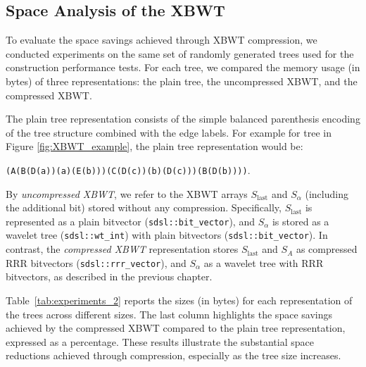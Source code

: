 \subsection{Space Analysis of the XBWT}
To evaluate the space savings achieved through XBWT compression, we conducted experiments on the same set of randomly generated trees used for the construction performance tests. For each tree, we compared the memory usage (in bytes) of three representations: the plain tree, the uncompressed XBWT, and the compressed XBWT.

The plain tree representation consists of the simple balanced parenthesis encoding of the tree structure combined with the edge labels. For example for tree in Figure \ref{fig:XBWT_example}, the plain tree representation would be:

\texttt{(A(B(D(a))(a)(E(b)))(C(D(c))(b)(D(c)))(B(D(b))))}.

By \emph{uncompressed XBWT}, we refer to the XBWT arrays $S_{\text{last}}$ and $S_{\alpha}$ (including the additional bit) stored without any compression. Specifically, $S_{\text{last}}$ is represented as a plain bitvector (\texttt{sdsl::bit\_vector}), and $S_{\alpha}$ is stored as a wavelet tree (\texttt{sdsl::wt\_int}) with plain bitvectors (\texttt{sdsl::bit\_vector}). In contrast, the \emph{compressed XBWT} representation stores $S_{\text{last}}$ and $S_{A}$ as compressed RRR bitvectors (\texttt{sdsl::rrr\_vector}), and $S_{\alpha}$ as a wavelet tree with RRR bitvectors, as described in the previous chapter.

Table~\ref{tab:experiments_2} reports the sizes (in bytes) for each representation of the trees across different sizes. The last column highlights the space savings achieved by the compressed XBWT compared to the plain tree representation, expressed as a percentage. These results illustrate the substantial space reductions achieved through compression, especially as the tree size increases.

